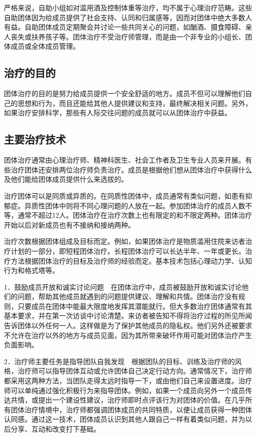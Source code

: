 严格来说，自助小组如对滥用酒及控制体重等治疗，均不属于心理治疗范畴。这些自助团体因为给成员提供了社会支持、认同和归属感等，因而对团体中绝大多数人有益。自助团体成员定期聚会并讨论一些共同关心的问题，如酗酒、摄食障碍、亲人丧失或扶养孩子等。团体治疗不受治疗师管理，而是由一个非专业的小组长、团体成员或全体成员管理。

\subsection{治疗的目的}

团体治疗的目的是努力给成员提供一个安全舒适的地方。成员不但可以理解他们自己的思想和行为，而且还能给其他人提供建议和支持，最终解决相关问题。另外，如果治疗安排科学，那些有人际交往问题的成员就可以从团体治疗中获益。

\subsection{主要治疗技术}

团体治疗通常由心理治疗师、精神科医生、社会工作者及卫生专业人员来开展。有些治疗团体还安排两位治疗师负责治疗。成员是根据他们想从团体治疗中获得什么及他们能给团体成员提供什么来选拔的。

治疗团体可以是同质或异质的。在同质性团体中，成员通常有类似问题，如患有抑郁症。异质性团体中则将不同心理问题的人放在一起。参加团体治疗的成员人数不等，通常不超过12人。团体治疗在治疗次数上也有限定的和不限定两种。团体治疗开始以后对新成员也有不接纳和接纳两种。

治疗次数根据团体组成及目标而定。例如，如果团体治疗是物质滥用住院来访者治疗计划的一部分，即短程团体治疗。长程团体治疗可以长达半年、一年或更长。治疗方法根据团体治疗的目标及治疗师的经验而定。基本技术包括心理动力学、认知行为和格式塔等。

1．鼓励成员开放和诚实讨论问题　在团体治疗中，成员被鼓励开放和诚实讨论他们的问题，帮助其他成员就遇到的问题提供建议、理解和共情。团体治疗没有规则，只要成员在团体中能最大限度地发挥其潜能就行。但大多数治疗团体通常有其基本要求，并在第一次访谈中讨论清楚。来访者被告知不得将治疗过程的所见所闻告诉团体以外任何一人。这样做是为了保护其他成员的隐私权。他们另外还被要求不允许在治疗以外的地方与成员见面，因为其所带来破坏作用可能对团体治疗产生负面影响。

2．治疗师主要任务是指导团队自我发现　根据团队的目标、训练及治疗师的风格，治疗师可以指导团体互动或允许团体自己决定行动方向。通常情况下，治疗师都采用这两种方法，当团队走得太远时指导一下，或由他们自己来设置进度。治疗师可以单纯通过强化积极行为来指导团体。例如，如果一个成员向另外一个成员传达共情，或提出一个建设性建议，治疗师即时点评该行为对团体的价值。在几乎所有团体治疗情境中，治疗师都强调团体成员的共同特质，以便让成员获得一种团体认同感。通过这一技术，团体成员认识到其他人跟自己一样有着类似问题，并为以后分享、互动和改变打下基础。

